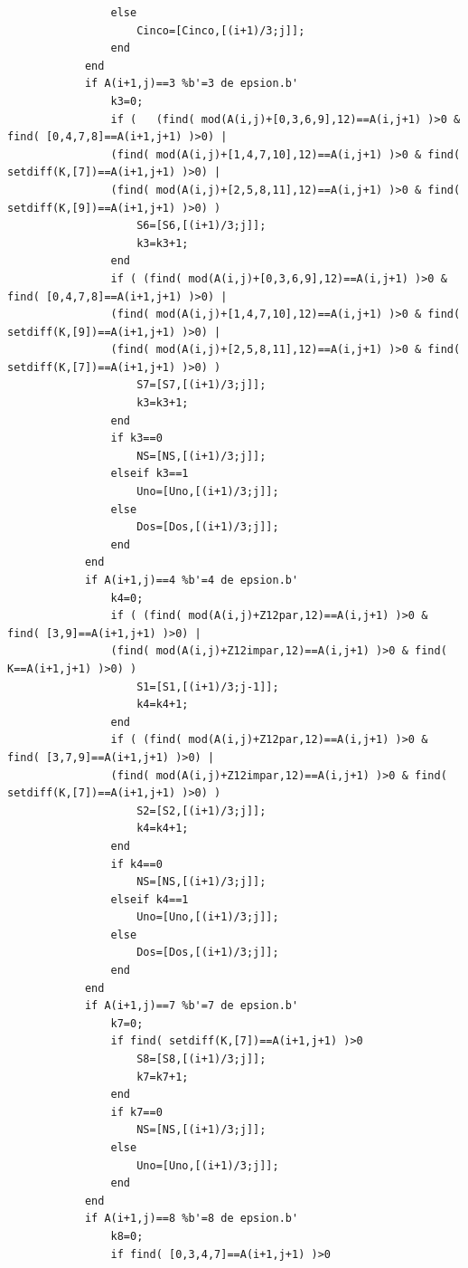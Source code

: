 \documentclass[letterpaper,12pt]{book}
\theoremstyle{definition} \newtheorem{Def}{Definición}[chapter]
\theoremstyle{definition} \newtheorem{Teo}{Teorema}[chapter]
\theoremstyle{definition} \newtheorem{Pro}{Proposición}[chapter]
\theoremstyle{definition} \newtheorem{Lema}{Lema}[chapter]
\begin{document}
{\begin{verbatim}
                else
                    Cinco=[Cinco,[(i+1)/3;j]];
                end
            end    
            if A(i+1,j)==3 %b'=3 de epsion.b'
                k3=0;
                if (   (find( mod(A(i,j)+[0,3,6,9],12)==A(i,j+1) )>0 & find( [0,4,7,8]==A(i+1,j+1) )>0) | 
                (find( mod(A(i,j)+[1,4,7,10],12)==A(i,j+1) )>0 & find( setdiff(K,[7])==A(i+1,j+1) )>0) | 
                (find( mod(A(i,j)+[2,5,8,11],12)==A(i,j+1) )>0 & find( setdiff(K,[9])==A(i+1,j+1) )>0) )
                    S6=[S6,[(i+1)/3;j]];
                    k3=k3+1;
                end
                if ( (find( mod(A(i,j)+[0,3,6,9],12)==A(i,j+1) )>0 & find( [0,4,7,8]==A(i+1,j+1) )>0) | 
                (find( mod(A(i,j)+[1,4,7,10],12)==A(i,j+1) )>0 & find( setdiff(K,[9])==A(i+1,j+1) )>0) | 
                (find( mod(A(i,j)+[2,5,8,11],12)==A(i,j+1) )>0 & find( setdiff(K,[7])==A(i+1,j+1) )>0) ) 
                    S7=[S7,[(i+1)/3;j]];
                    k3=k3+1;
                end
                if k3==0
                    NS=[NS,[(i+1)/3;j]];
                elseif k3==1
                    Uno=[Uno,[(i+1)/3;j]];
                else 
                    Dos=[Dos,[(i+1)/3;j]]; 
                end 
            end    
            if A(i+1,j)==4 %b'=4 de epsion.b'
                k4=0;
                if ( (find( mod(A(i,j)+Z12par,12)==A(i,j+1) )>0 & find( [3,9]==A(i+1,j+1) )>0) | 
                (find( mod(A(i,j)+Z12impar,12)==A(i,j+1) )>0 & find( K==A(i+1,j+1) )>0) )
                    S1=[S1,[(i+1)/3;j-1]];
                    k4=k4+1;
                end    
                if ( (find( mod(A(i,j)+Z12par,12)==A(i,j+1) )>0 & find( [3,7,9]==A(i+1,j+1) )>0) | 
                (find( mod(A(i,j)+Z12impar,12)==A(i,j+1) )>0 & find( setdiff(K,[7])==A(i+1,j+1) )>0) )
                    S2=[S2,[(i+1)/3;j]];
                    k4=k4+1;
                end
                if k4==0
                    NS=[NS,[(i+1)/3;j]];
                elseif k4==1
                    Uno=[Uno,[(i+1)/3;j]];
                else 
                    Dos=[Dos,[(i+1)/3;j]]; 
                end 
            end    
            if A(i+1,j)==7 %b'=7 de epsion.b'
                k7=0;
                if find( setdiff(K,[7])==A(i+1,j+1) )>0
                    S8=[S8,[(i+1)/3;j]];
                    k7=k7+1;
                end
                if k7==0
                    NS=[NS,[(i+1)/3;j]];
                else
                    Uno=[Uno,[(i+1)/3;j]];
                end   
            end    
            if A(i+1,j)==8 %b'=8 de epsion.b'
                k8=0;
                if find( [0,3,4,7]==A(i+1,j+1) )>0

\end{verbatim}}
\end{document}

